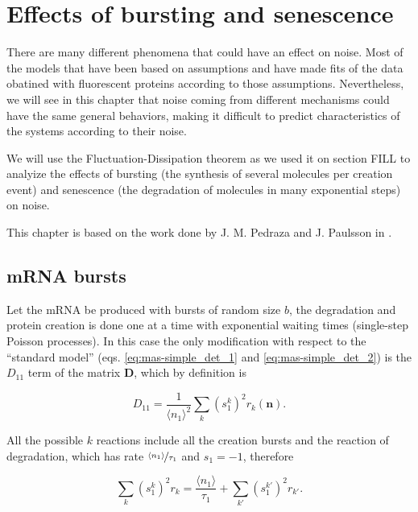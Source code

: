 \chapter{Effects of bursting and senescence}

There are many different phenomena that could have an effect on noise. Most of the models that have been based on assumptions and have made fits of the data obatined with fluorescent proteins according to those assumptions. Nevertheless, we will see in this chapter that noise coming from different mechanisms could have the same general behaviors, making it difficult to predict characteristics of the systems according to their noise.

We will use the Fluctuation-Dissipation theorem as we used it on section FILL to analyize the effects of bursting (the synthesis of several molecules per creation event) and senescence (the degradation of molecules in many exponential steps) on noise.

This chapter is based on the work done by J. M. Pedraza and J. Paulsson in \cite{pedraza08}.


\section{mRNA bursts}
Let the mRNA be produced with bursts of random size $b$, the degradation and protein creation is done one at a time with exponential waiting times (single-step Poisson processes). In this case the only modification with respect to the ``standard model'' (eqs. \eqref{eq:mas-simple_det_1} and \eqref{eq:mas-simple_det_2}) is the $D_{11}$ term of the matrix $\mathbf{D}$, which by definition is

\begin{equation}
  \label{eq:mrnab1}
  D_{11}=\frac{1}{\langle n_1\rangle^2}\sum_k(s_1^k)^2r_k(\mathbf{n}).
\end{equation}

All the possible $k$ reactions include all the creation bursts and the reaction of degradation, which has rate $\nicefrac{\langle n_1 \rangle}{\tau_1}$ and $s_1=-1$, therefore

\begin{equation}
  \label{eq:mrnab2}
  \sum_k(s_1^k)^2r_k = \frac{\langle n_1 \rangle}{\tau_1} + \sum_{k'}(s_1^{k'})^2r_{k'}.
\end{equation}

